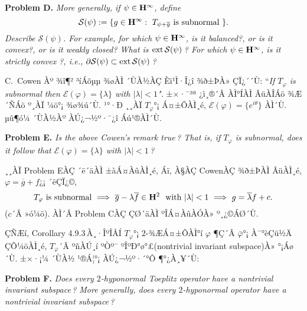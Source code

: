 \documentclass[12pt,a4paper,2sided]{article}
\begin{document}
\vspace{.2 cm}

{\bf Problem D.} {\sl More generally, if $\psi
\in\bold{H}^\infty$, define
$$
\mathcal{S}(\psi):=\{g\in\bold{H}^\infty:\ T_{\psi+\overline g}\ \mbox{is subnormal}\ \}.
$$
Describe $\mathcal{S}(\psi)$. For example, for which $\psi\in \bold{H}^\infty$, is it balanced?, or is it convex?, or is it weakly closed?
What is ${\rm ext}\,\mathcal{S}(\psi)$\,?
For which $\psi\in \bold{H}^\infty$, is it strictly convex ?, i.e.,
$\partial\mathcal{S}(\psi)\subset{\rm ext}\,\mathcal{S}(\psi)$\,?
}

\vspace{.2 cm} C.\ Cowen \cite{Cow3}Àº ¾î¶² ³íÁõµµ ¾øÀÌ ´ÙÀ½ÀÇ
Èï¹Ì·Î¿î ¾ð±ÞÀ» ÇÏ¿´´Ù: ``{\it If $T_\varphi$ is subnormal then
$\mathcal{E}(\varphi)=\{\lambda\}$ with $|\lambda|<1$".} ±×·¯³ª
¿ì¸®´Â ÀÌ°ÍÀÌ ÂüÀÎÁö ¾Æ´ÑÁö º¸ÀÏ ¼ö°¡ ¾ø¾ú´Ù. ¹°·Ð ¸¸ÀÏ
$T_\varphi$°¡ Á¤±ÔÀÌ¸é, $\mathcal{E}(\varphi)=\{e^{i\theta}\}$ ÀÌ´Ù.
µû¶ó¼­ ´ÙÀ½Àº ÀÚ¿¬½º·¯¿î Áú¹®ÀÌ´Ù.

\vspace{.2 cm} {\bf Problem E.} {\sl Is the above Cowen's remark
true\,? That is, if $T_\varphi$ is subnormal, does it follow that
$\mathcal{E}(\varphi)=\{\lambda\}$ with $|\lambda|<1$\,? }

\vspace{.2 cm}

¸¸ÀÏ Problem EÀÇ ´ë´äÀÌ ±àÁ¤ÀûÀÌ¸é, Áï,
À§ÀÇ CowenÀÇ ¾ð±ÞÀÌ ÂüÀÌ¸é, $\varphi=\overline g+f$¿¡ ´ëÇÏ¿©,
$$
\mbox{$T_\varphi$ is subnormal}\ \Longrightarrow \ \overline
g-\lambda \overline f\in \bold{H}^2\ \ \mbox{with}\ |\lambda|<1\
\Longrightarrow\ g=\overline\lambda f+c.
$$
($c$´Â »ó¼ö). ÀÌ´Â Problem CÀÇ ÇØ´äÀÌ ºÎÁ¤ÀûÀÓÀ» º¸¿©ÁØ´Ù.

\vspace{.2 cm}

ÇÑÆí, Corollary 4.9.3\,À¸·ÎºÎÅÍ $T_\varphi$°¡ $2$-¾ÆÁ¤±ÔÀÌ°í
$\varphi$ ¶Ç´Â $\bar\varphi$°¡ À¯°èÇü½Ä ÇÔ¼öÀÌ¸é, $T_\varphi$´Â
ºñÀÚ¸í ºÒº¯ ºÎºÐ°ø°£(nontrivial invariant subspace)À» °¡Áø´Ù. ±×·¡¼­
´ÙÀ½ ¹®Á¦°¡ ÀÚ¿¬½º·´°Ô ¶°¿À¸¥´Ù: \vspace{.2 cm}

 {\bf Problem F.} {\sl Does every $2$-hyponormal
Toeplitz operator have a nontrivial invariant subspace\,? More
generally, does every $2$-hyponormal operator have a nontrivial
invariant subspace\,? }

\vspace{.2 cm}


\newpage{} \vspace{0.8cm}
\end{document}
